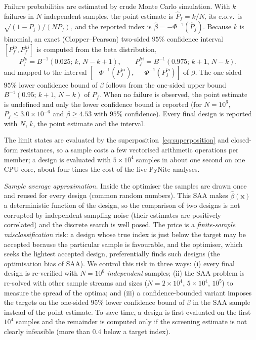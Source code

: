 Failure probabilities are estimated by crude Monte Carlo simulation. With $k$ failures in $N$
independent samples, the point estimate is $\hat P_f = k/N$, its c.o.v.\ is
$\sqrt{(1-P_f)/(NP_f)}$, and the reported index is $\hat\beta = -\Phi^{-1}(\hat P_f)$. Because $k$
is binomial, an exact (Clopper--Pearson) two-sided $95\%$ confidence interval
$[P_f^{lo},P_f^{hi}]$ is computed from the beta distribution,
\begin{equation}
P_f^{lo} = B^{-1}\!\left(0.025;\,k,\,N-k+1\right),\qquad
P_f^{hi} = B^{-1}\!\left(0.975;\,k+1,\,N-k\right),
\label{eq:cp}
\end{equation}
and mapped to the interval $[-\Phi^{-1}(P_f^{hi}),\,-\Phi^{-1}(P_f^{lo})]$ of $\beta$. The one-sided
$95\%$ lower confidence bound of $\beta$ follows from the one-sided upper bound
$B^{-1}(0.95;\,k+1,\,N-k)$ of $P_f$. When no failure is observed, the point estimate is undefined
and only the lower confidence bound is reported (for $N=10^6$, $P_f\le3.0\times10^{-6}$ and
$\beta\ge4.53$ with $95\%$ confidence). Every final design is reported with $N$, $k$, the point
estimate and the interval.

The limit states are evaluated by the superposition~\eqref{eq:superposition} and closed-form
resistances, so a sample costs a few vectorised arithmetic operations per member; a design is
evaluated with $5\times10^4$ samples in about one second on one CPU core, about four times the cost
of the five PyNite analyses.

\emph{Sample average approximation.} Inside the optimiser the samples are drawn once and reused
for every design (common random numbers). This SAA \citep{Kleywegt2002} makes $\hat\beta(\mathbf{x})$
a deterministic function of the design, so the comparison of two designs is not corrupted by
independent sampling noise (their estimates are positively correlated) and the discrete search
is well posed. The price is a \emph{finite-sample misclassification} risk: a design whose true
index is just below the target may be accepted because the particular sample is favourable, and
the optimiser, which seeks the lightest accepted design, preferentially finds such designs (the
optimisation bias of SAA). We control this risk in three ways: (i) every final design is
re-verified with $N=10^6$ \emph{independent} samples; (ii) the SAA problem is re-solved with other
sample streams and sizes ($N=2\times10^4$, $5\times10^4$, $10^5$) to measure the spread of the
optima; and (iii) a confidence-bounded variant imposes the targets on the one-sided $95\%$ lower
confidence bound of $\beta$ in the SAA sample instead of the point estimate. To save time, a
design is first evaluated on the first $10^4$ samples and the remainder is computed only if the
screening estimate is not clearly infeasible (more than 0.4 below a target index).

